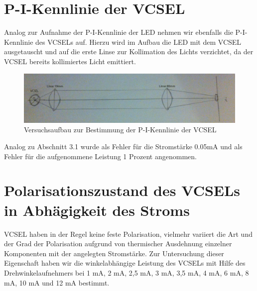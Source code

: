 \documentclass[bigchapter,colorback,accentcolor=tud4b,linedtoc,11pt]{tudreport}
\begin{document}
\begin{center}
\begin{figure}[H]
\end{figure}
\end{center}

\section{P-I-Kennlinie der VCSEL}

Analog zur Aufnahme der P-I-Kennlinie der LED nehmen wir ebenfalls die P-I-Kennlinie des VCSELs auf. Hierzu wird im Aufbau die LED mit dem VCSEL ausgetauscht und auf die erste Linse zur Kollimation des Lichts verzichtet, da der VCSEL bereits kollimiertes Licht emittiert.

\begin{figure}[ht!]
\centering
\includegraphics[width=150mm]{img/skizzen/versuch_35.jpg}
\caption{Versuchsaufbau zur Bestimmung der P-I-Kennlinie der VCSEL}
\label{PI-Kennlinie-VCSEL}
\end{figure}

Analog zu Abschnitt 3.1 wurde als Fehler für die Stromstärke 0.05mA und als Fehler für die aufgenommene Leistung 1 Prozent angenommen.

\section{Polarisationszustand des VCSELs in Abhägigkeit des Stroms}
VCSEL haben in der Regel keine feste Polarisation, vielmehr variiert die Art und der Grad der Polarisation aufgrund von thermischer Ausdehnung einzelner Komponenten mit der angelegten Stromstärke. Zur Untersuchung dieser Eigenschaft haben wir die winkelabhängige Leistung des VCSELs mit Hilfe des Drehwinkelaufnehmers bei 1 mA, 2 mA, 2,5 mA, 3 mA, 3,5 mA, 4 mA, 6 mA, 8 mA, 10 mA und 12 mA bestimmt.
\end{document}
